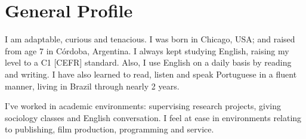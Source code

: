 
\makeprofile %

\vfill 


% 

\section{General Profile}

I am adaptable, curious and tenacious. I was born in Chicago, USA; and raised from age 7 in Córdoba, Argentina. 
%
I always kept studying English, raising my level to a C1 [CEFR] standard. 
Also, I use English on a daily basis by reading and writing. 
I have also learned to read, listen and speak Portuguese in a fluent manner, living in Brazil through nearly 2 years. 


I've worked in academic environments: supervising research projects, giving sociology classes and English conversation. %
I feel at ease in environments relating to publishing, film production, programming and service.

